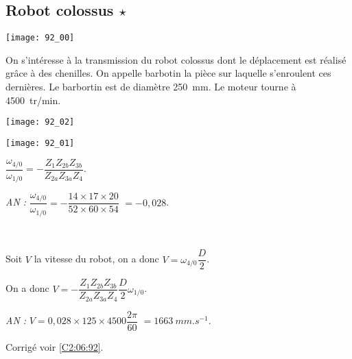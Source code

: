 \normaltrue \difficilefalse \tdifficilefalse
\correctionfalse


\subsection*{Robot colossus $\star$ \label{C2:06:92}}
\setcounter{question}{0}


\ifcorrection
\else
{}
\fi

\ifprof
\else


\begin{marginfigure}
\texttt{[image: 92\_00]}
\end{marginfigure}
On s'intéresse à la transmission du robot colossus dont le déplacement est réalisé grâce à des chenilles. On appelle barbotin la pièce sur laquelle s'enroulent ces dernières. Le barbortin est de diamètre \SI{250}{mm}.
Le moteur tourne à \SI{4500}{tr/min}.

\begin{marginfigure}
\texttt{[image: 92\_02]}
\end{marginfigure}

\begin{center}
\texttt{[image: 92\_01]}
\end{center}


\fi




\ifprof
\else
\fi


\begin{corrige}
$\dfrac{\omega_{4/0}}{\omega_{1/0}}  = - \dfrac{Z_1 Z_{2b}Z_{3b}}{Z_{2a}Z_{3a}Z_{4}}$.

\textit{AN :} $\dfrac{\omega_{4/0}}{\omega_{1/0}}  = - \dfrac{14\times  17 \times 20}{52 \times 60 \times 54}$ $= - 0,028$.
\end{corrige}

\ifprof ~\\

\else
\fi


\begin{corrige}
Soit $V$ la vitesse du robot, on a donc $V = \omega_{4/0} \dfrac{D}{2}$.

On a donc $V = - \dfrac{Z_1 Z_{2b}Z_{3b}}{Z_{2a}Z_{3a}Z_{4}}  \dfrac{D}{2} \omega_{1/0}$.

\textit{AN :} $V = 0,028 \times 125 \times 4500\dfrac{2\pi}{60}$ $=\SI{1663}{mm.s^{-1}}$. 
\end{corrige}


\ifprof
\else
\begin{flushright}
\footnotesize{Corrigé  voir \ref{C2:06:92}.}
\end{flushright}%
\fi